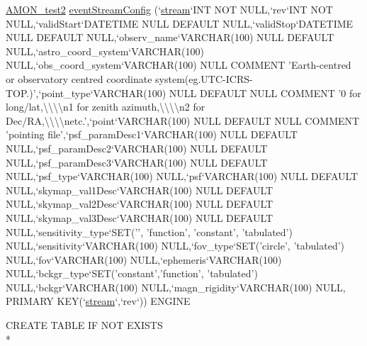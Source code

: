 \begin{DoxyCompactItemize}
\hyperlink{db__mc__build_8sql_a19c21c59303d8b6591b92240ff7de1d5}{A\-M\-O\-N\-\_\-test2} \hyperlink{db__mc__build_8sql_a2932d2685911e3e53938c3498b7f53b9}{event\-Stream\-Config} (`\hyperlink{db__mc__build_8sql_a67b7e9fc922cbf49b5ae3124240f4188}{stream}`I\-N\-T N\-O\-T N\-U\-L\-L,`rev`I\-N\-T N\-O\-T N\-U\-L\-L,`valid\-Start`D\-A\-T\-E\-T\-I\-M\-E N\-U\-L\-L D\-E\-F\-A\-U\-L\-T N\-U\-L\-L,`valid\-Stop`D\-A\-T\-E\-T\-I\-M\-E N\-U\-L\-L D\-E\-F\-A\-U\-L\-T N\-U\-L\-L,`observ\-\_\-name`V\-A\-R\-C\-H\-A\-R(100) N\-U\-L\-L D\-E\-F\-A\-U\-L\-T N\-U\-L\-L,`astro\-\_\-coord\-\_\-system`V\-A\-R\-C\-H\-A\-R(100) N\-U\-L\-L,`obs\-\_\-coord\-\_\-system`V\-A\-R\-C\-H\-A\-R(100) N\-U\-L\-L C\-O\-M\-M\-E\-N\-T 'Earth-\/centred or observatory centred coordinate system(eg.\-U\-T\-C-\/I\-C\-R\-S-\/T\-O\-P.)',`point\-\_\-type`V\-A\-R\-C\-H\-A\-R(100) N\-U\-L\-L D\-E\-F\-A\-U\-L\-T N\-U\-L\-L C\-O\-M\-M\-E\-N\-T '0 for long/lat,\textbackslash{}\textbackslash{}\textbackslash{}\textbackslash{}n1 for zenith azimuth,\textbackslash{}\textbackslash{}\textbackslash{}\textbackslash{}n2 for Dec/R\-A,\textbackslash{}\textbackslash{}\textbackslash{}\textbackslash{}netc.',`point`V\-A\-R\-C\-H\-A\-R(100) N\-U\-L\-L D\-E\-F\-A\-U\-L\-T N\-U\-L\-L C\-O\-M\-M\-E\-N\-T 'pointing file',`psf\-\_\-param\-Desc1`V\-A\-R\-C\-H\-A\-R(100) N\-U\-L\-L D\-E\-F\-A\-U\-L\-T N\-U\-L\-L,`psf\-\_\-param\-Desc2`V\-A\-R\-C\-H\-A\-R(100) N\-U\-L\-L D\-E\-F\-A\-U\-L\-T N\-U\-L\-L,`psf\-\_\-param\-Desc3`V\-A\-R\-C\-H\-A\-R(100) N\-U\-L\-L D\-E\-F\-A\-U\-L\-T N\-U\-L\-L,`psf\-\_\-type`V\-A\-R\-C\-H\-A\-R(100) N\-U\-L\-L,`psf`V\-A\-R\-C\-H\-A\-R(100) N\-U\-L\-L D\-E\-F\-A\-U\-L\-T N\-U\-L\-L,`skymap\-\_\-val1\-Desc`V\-A\-R\-C\-H\-A\-R(100) N\-U\-L\-L D\-E\-F\-A\-U\-L\-T N\-U\-L\-L,`skymap\-\_\-val2\-Desc`V\-A\-R\-C\-H\-A\-R(100) N\-U\-L\-L D\-E\-F\-A\-U\-L\-T N\-U\-L\-L,`skymap\-\_\-val3\-Desc`V\-A\-R\-C\-H\-A\-R(100) N\-U\-L\-L D\-E\-F\-A\-U\-L\-T N\-U\-L\-L,`sensitivity\-\_\-type`S\-E\-T('', 'function', 'constant', 'tabulated') N\-U\-L\-L,`sensitivity`V\-A\-R\-C\-H\-A\-R(100) N\-U\-L\-L,`fov\-\_\-type`S\-E\-T('circle', 'tabulated') N\-U\-L\-L,`fov`V\-A\-R\-C\-H\-A\-R(100) N\-U\-L\-L,`ephemeris`V\-A\-R\-C\-H\-A\-R(100) N\-U\-L\-L,`bckgr\-\_\-type`S\-E\-T('constant','function', 'tabulated') N\-U\-L\-L,`bckgr`V\-A\-R\-C\-H\-A\-R(100) N\-U\-L\-L,`magn\-\_\-rigidity`V\-A\-R\-C\-H\-A\-R(100) N\-U\-L\-L, P\-R\-I\-M\-A\-R\-Y K\-E\-Y(`\hyperlink{db__mc__build_8sql_a67b7e9fc922cbf49b5ae3124240f4188}{stream}`,`rev`)) E\-N\-G\-I\-N\-E
\item 
C\-R\-E\-A\-T\-E T\-A\-B\-L\-E I\-F N\-O\-T E\-X\-I\-S\-T\-S \\*

\end{DoxyCompactItemize}
